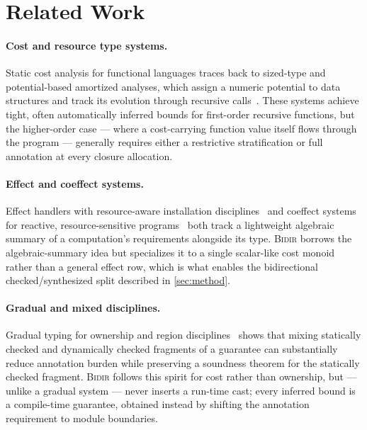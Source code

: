 \section{Related Work}
\label{sec:related}

\paragraph{Cost and resource type systems.}
Static cost analysis for functional languages traces back to
sized-type and potential-based amortized analyses, which assign a
numeric potential to data structures and track its evolution through
recursive calls~\cite{thorvaldsen2016abstract}. These systems achieve
tight, often automatically inferred bounds for first-order recursive
functions, but the higher-order case --- where a cost-carrying function
value itself flows through the program --- generally requires either a
restrictive stratification or full annotation at every closure
allocation.

\paragraph{Effect and coeffect systems.}
Effect handlers with resource-aware installation
disciplines~\cite{vantassel2023effect} and coeffect systems for
reactive, resource-sensitive programs~\cite{marchetti2019coeffect} both
track a lightweight algebraic summary of a computation's requirements
alongside its type. \textsc{Bidir} borrows the algebraic-summary idea
but specializes it to a single scalar-like cost monoid rather than a
general effect row, which is what enables the bidirectional
checked/synthesized split described in \cref{sec:method}.

\paragraph{Gradual and mixed disciplines.}
Gradual typing for ownership and region
disciplines~\cite{halvorsen2020gradual,brandvold2020region} shows that
mixing statically checked and dynamically checked fragments of a
guarantee can substantially reduce annotation burden while preserving a
soundness theorem for the statically checked fragment. \textsc{Bidir}
follows this spirit for cost rather than ownership, but --- unlike a
gradual system --- never inserts a run-time cast; every inferred bound
is a compile-time guarantee, obtained instead by shifting the annotation
requirement to module boundaries.

